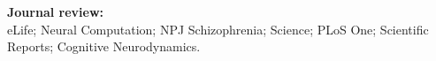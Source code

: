 

\textbf{Journal review:} \\
eLife;
Neural Computation;
NPJ Schizophrenia;
Science;
PLoS One;
Scientific Reports;
Cognitive Neurodynamics.

